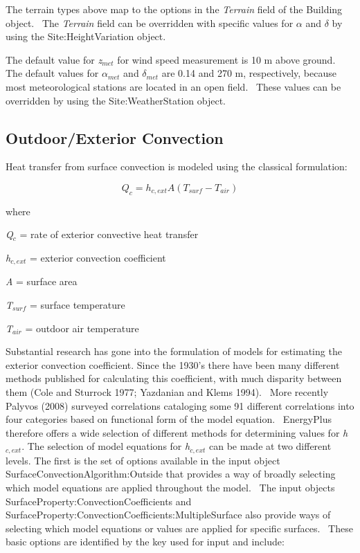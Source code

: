 The terrain types above map to the options in the \emph{Terrain} field of the Building object.~ The \emph{Terrain} field can be overridden with specific values for \emph{$\alpha$} and \emph{$\delta$} by using the Site:HeightVariation object.

The default value for \emph{z\(_{met}\)} for wind speed measurement is 10 m above ground.~ The default values for \emph{$\alpha$\(_{met}\)} and \emph{$\delta$\(_{met}\)} are 0.14 and 270 m, respectively, because most meteorological stations are located in an open field.~ These values can be overridden by using the Site:WeatherStation object.

\subsection{Outdoor/Exterior Convection}\label{outdoorexterior-convection}

Heat transfer from surface convection is modeled using the classical formulation:

\begin{equation}
{Q_c} = {h_{c,ext}}A\left( {{T_{surf}} - {T_{air}}} \right)
\end{equation}

where

\emph{Q\(_{c}\)} = rate of exterior convective heat transfer

\emph{h\(_{c,ext}\)} = exterior convection coefficient

\emph{A} = surface area

\emph{T\(_{surf}\)} = surface temperature

\emph{T\(_{air}\)} = outdoor air temperature

Substantial research has gone into the formulation of models for estimating the exterior convection coefficient. Since the 1930's there have been many different methods published for calculating this coefficient, with much disparity between them (Cole and Sturrock 1977; Yazdanian and Klems 1994).~ More recently Palyvos (2008) surveyed correlations cataloging some 91 different correlations into four categories based on functional form of the model equation.~ EnergyPlus therefore offers a wide selection of different methods for determining values for \emph{h\(_{c,ext}\)}. The selection of model equations for \emph{h\(_{c,ext}\)} can be made at two different levels. The first is the set of options available in the input object SurfaceConvectionAlgorithm:Outside that provides a way of broadly selecting which model equations are applied throughout the model.~ The input objects SurfaceProperty:ConvectionCoefficients and SurfaceProperty:ConvectionCoefficients:MultipleSurface also provide ways of selecting which model equations or values are applied for specific surfaces.~ These basic options are identified by the key used for input and include:

